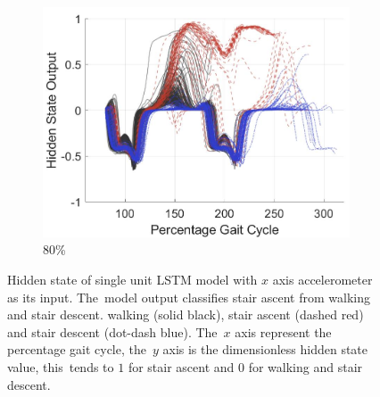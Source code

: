 \begin{figure}[!hbt]
     \hspace{0.5em}
     \begin{subfigure}[H]{0.28\textwidth}
         \centering
         \includegraphics[width=\textwidth]{content/4-LSTM_Behaviour/results/hidden_state/gyro_y_sa_v_w-sd/80_Participant_04.jpg}
         \caption{80\%}
         \label{subfig:gyro_y_w_v_sa_sd_80}
     \end{subfigure}
     \vspace{3pt}
    \caption{Hidden state of single unit LSTM model with $x$ axis accelerometer as its input. The~model output classifies stair ascent from walking and stair descent. walking (solid black), stair ascent (dashed red) and stair descent (dot-dash blue). The~$x$ axis represent the percentage gait cycle, the~$y$ axis is the dimensionless hidden state value, this~tends to $1$ for stair ascent and $0$ for walking and stair descent.}
    \label{fig:hidden-state-gyro-y-w_v_sa-sd}
\end{figure}

